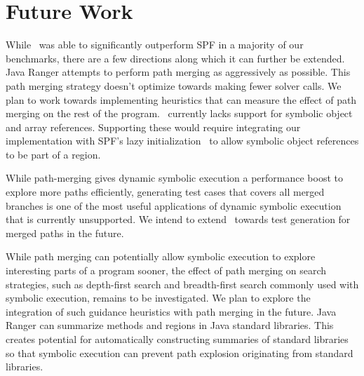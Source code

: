 \section{Future Work}
\label{sec:futureWork}
While \tool\ was able to significantly outperform SPF in a majority of our benchmarks, there are a few directions
along which it can further be extended.
%
Java Ranger attempts to perform path merging as aggressively as possible.
%
This path merging strategy doesn't optimize towards making fewer solver calls.
%
We plan to work towards implementing heuristics that can measure the effect of path merging on the rest of the program.
%
\tool\ currently lacks support for symbolic object and array references.
%
Supporting these would require integrating our implementation with
SPF\rq s lazy initialization~\cite{spf} to allow symbolic object references to be part of a region.

While path-merging gives dynamic symbolic execution a performance boost to explore more paths
efficiently, generating test cases that covers all merged branches is one of the most useful applications of dynamic
symbolic execution that is currently unsupported.
%
We intend to extend \tool\ towards test generation for merged paths in the future.

While path merging can potentially allow symbolic execution to explore interesting parts of a program sooner, the
effect of path merging on search strategies, such as depth-first search and breadth-first search commonly used with
symbolic execution, remains to be investigated.
%
We plan to explore the integration of such guidance heuristics with path merging in the future.
%
Java Ranger can summarize methods and regions in Java standard libraries.
%
This creates potential for automatically constructing summaries of standard libraries so that symbolic execution
can prevent path explosion originating from standard libraries.